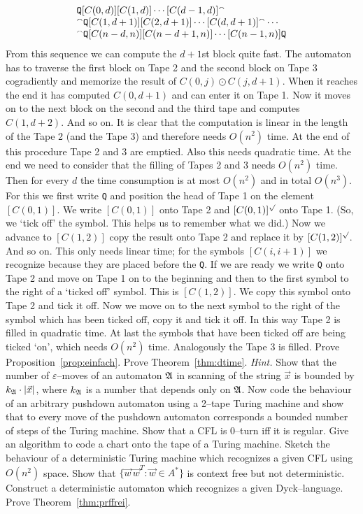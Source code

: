 \begin{equation}
\begin{array}{l}
\mbox{\tt Q}[C(0,d)][C(1,d)]\dotsb [C(d-1,d)]{^{\smallfrown}} \\
{^{\smallfrown}} \mbox{\tt Q}[C(1,d+1)][C(2,d+1)]\dotsb [C(d,d+1)] {^{\smallfrown}} \dotsb \\
{^{\smallfrown}} \mbox{\tt Q} [C(n-d,n)][C(n-d+1,n)]\dotsb [C(n-1,n)]\mbox{\tt Q}
\end{array}
\end{equation}
From this sequence we can compute the $d+1$st block quite fast.
The automaton has to traverse the first block on Tape 2 and the
second block on Tape 3 cogradiently and memorize the result of
$C(0,j) \odot C(j,d+1)$. When it reaches the end it has computed
$C(0,d+1)$ and can enter it on Tape 1. Now it moves on to the
next block on the second and the third tape and computes
$C(1,d+2)$. And so on. It is clear that the computation is linear
in the length of the Tape 2 (and the Tape 3) and therefore needs
$O(n^2)$ time. At the end of this procedure Tape 2 and 3 are
emptied. Also this needs quadratic time. At the end we need to
consider that the filling of Tapes 2 and 3 needs
$O(n^2)$ time. Then for every $d$ the time consumption is
at most $O(n^2)$ and in total $O(n^3)$.
For this we first write {\tt Q} and position the head of Tape 1
on the element $[C(0,1)]$. We write $[C(0,1)]$ onto Tape 2
and $[C(0,1)]^{\surd}$ onto Tape 1. (So, we 
`tick off' the symbol. This helps us to remember what we did.)
Now we advance to $[C(1,2)]$ copy the result onto Tape 2
and replace it by $[C(1,2)]^{\surd}$. And so on. This only
needs linear time; for the symbols $[C(i,i+1)]$ we recognize
because they are placed before the {\tt Q}. If we are ready
we write {\tt Q} onto Tape 2 and move on Tape 1 on to the
beginning and then to the first symbol to the right of
a `ticked off' symbol. This is $[C(1,2)]$. We copy this symbol
onto Tape 2 and tick it off. Now we move on to the next symbol
to the right of the symbol which has been ticked off, copy it
and tick it off. In this way Tape 2 is filled in quadratic
time. At last the symbols that have been ticked off are being
ticked `on', which needs $O(n^2)$ time. Analogously the
Tape 3 is filled.
\proofend
\vplatz
\exercise
Prove Proposition~\ref{prop:einfach}.
\vplatz
\exercise
Prove Theorem~\ref{thm:dtime}. {\it Hint.}
Show that the number of $\varepsilon$--moves
of an automaton $\mathfrak{A}$ in scanning of the string
$\vec{x}$ is bounded by $k_{\mathfrak{A}} \cdot |\vec{x}|$,
where $k_{\mathfrak{A}}$ is a number that depends only on
$\mathfrak{A}$. Now code the behaviour of an arbitrary
pushdown automaton using a 2--tape Turing machine and
show that to every move of the pushdown automaton
corresponds a bounded number of steps of the Turing
machine.
\vplatz
\exercise
Show that a CFL is 0--turn iff it is regular.
\vplatz
\exercise
Give an algorithm to code a chart onto the tape of a Turing
machine.
\vplatz
\exercise
Sketch the behaviour of a deterministic Turing machine
which recognizes a given CFL using $O(n^2)$ space.
\vplatz
\exercise
Show that $\{\vec{w}\, \vec{w}^T : \vec{w} \in A^{\ast}\}$ is
context free but not deterministic.
\vplatz
\exercise
Construct a deterministic automaton  which recognizes a given
Dyck--language.
\vplatz
\exercise
Prove Theorem~\ref{thm:prffrei}.

